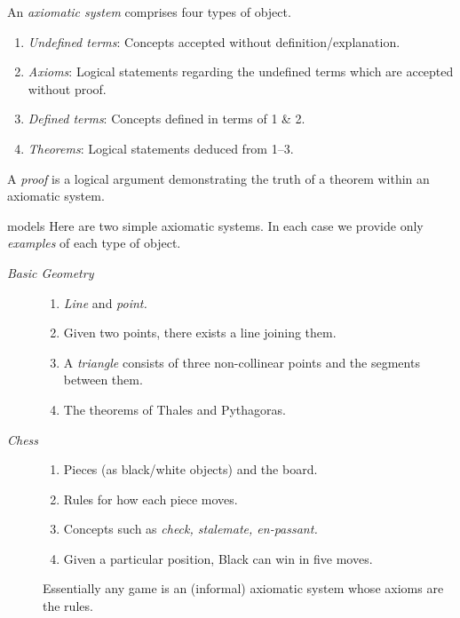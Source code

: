 \begin{defn}{}{}
	An \emph{axiomatic system\footnotemark} comprises four types of object.
	\begin{enumerate}
	  \item \emph{Undefined terms}: Concepts accepted without definition/explanation.
	  \item \emph{Axioms}: Logical statements regarding the undefined terms which are accepted without proof.
	  \item \emph{Defined terms}: Concepts defined in terms of 1 \& 2.
	  \item \emph{Theorems}: Logical statements deduced from 1--3.
	\end{enumerate}
	A \emph{proof} is a logical argument demonstrating the truth of a theorem within an axiomatic system.
\end{defn}




\begin{examples}{}{models}
	Here are two simple axiomatic systems. In each case we provide only \emph{examples} of each type of object.
	\begin{description}
		\item[\emph{Basic Geometry}]\begin{enumerate}
		  \item \emph{Line} and \emph{point.}
		  \item Given two points, there exists a line joining them.
		  \item A \emph{triangle} consists of three non-collinear points and the segments between them. 
		  \item The theorems of Thales and Pythagoras.
	  \end{enumerate}
		\item[\emph{Chess}]\begin{enumerate}
		  \item Pieces (as black/white objects) and the board.
		  \item Rules for how each piece moves.
		  \item Concepts such as \emph{check, stalemate, en-passant.}
		  \item Given a particular position, Black can win in five moves.
	  \end{enumerate}
	  Essentially any game is an (informal) axiomatic system whose axioms are the rules.
	\end{description}
\end{examples}



